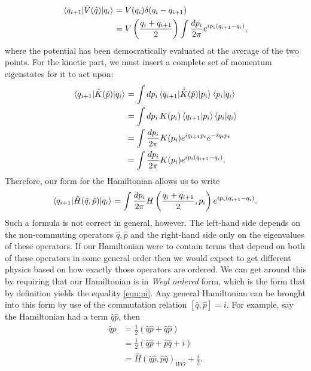 \begin{equation}
\begin{split}
\mathinner{\langle q_{i+1}\vert\hat{V}(\hat{q})\vert q_i\rangle}_{} &= V(q_i) \delta(q_i - q_{i+1}) \\
&= V \left(\frac{q_i + q_{i+1}}{2} \right) \int \frac{d p_i}{2 \pi} e^{i p_i(q_{i+1} - q_i)},
\end{split}
\end{equation}
where the potential has been democratically evaluated at the average of the two points. For the kinetic part, we must insert a complete set of momentum eigenstates for it to act upon:
\begin{equation}
\begin{split}
\mathinner{\langle q_{i+1}\vert\hat{K}(\hat{p})\vert q_i\rangle}_{} & = \int dp_i \mathinner{\langle q_{i+1}\vert\hat{K}(\hat{p})\vert p_i\rangle}_{}\left<p_i|q_i \right> \\
&= \int dp_i \hspace{2pt} K(p_i) \left<q_{i+1}|p_i \right> \left<p_i|q_i \right> \\
&= \int \frac{dp_i}{2 \pi}K(p_i) e^{i q_{i+1}p_i} e^{-i q_i p_i}  \\
&= \int \frac{dp_i}{2 \pi}K(p_i) e^{i p_i(q_{i+1}-q_i)}.
\end{split}
\end{equation}
Therefore, our form for the Hamiltonian allows us to write
\begin{equation}
\label{eqn:pi}
\mathinner{\langle q_{i+1}\vert\hat{H}(\hat{q}, \hat{p})\vert q_i\rangle}_{} = \int \frac{d p_i}{2 \pi} H\left(\frac{q_i + q_{i+1}}{2}, p_i \right) e^{i p_i (q_{i+1}-q_i)}.
\end{equation}
Such a formula is not correct in general, however. The left-hand side depends on the non-commuting operators $\hat{q}, \hat{p}$ and the right-hand side only on the eigenvalues of these operators. If our Hamiltonian were to contain terms that depend on both of these operators in some general order then we would expect to get different physics based on how exactly those operators are ordered. We can get around this by requiring that our Hamiltonian is in \emph{Weyl ordered} form, which is the form that by definition yields the equality \ref{eqn:pi}. Any general Hamiltonian can be brought into this form by use of the commutation relation $[\hat{q}, \hat{p}] = i$. For example, say the Hamiltonian had a term $\hat{q} \hat{p}$, then
\begin{equation}
\begin{split}
\hat{q} \hat{p} &= \frac{1}{2}( \hat{q} \hat{p} + \hat{q} \hat{p}) \\
&= \frac{1}{2}(\hat{q} \hat{p} + \hat{p} \hat{q} + i) \\
&= \hat{H}(\hat{q} \hat{p}, \hat{p} \hat{q})_{WO} + \frac{i}{2}. 
\end{split}
\end{equation}
